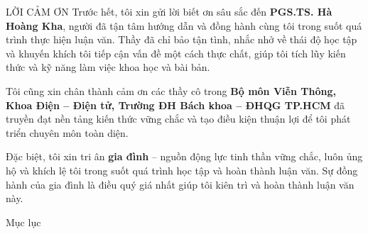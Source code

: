 \begin{frame}[plain]
\centering
\begin{block}{\LARGE LỜI CẢM ƠN}
\small
Trước hết, tôi xin gửi lời biết ơn sâu sắc đến 
\textbf{PGS.TS. Hà Hoàng Kha}, người đã tận tâm hướng dẫn và đồng hành cùng tôi trong suốt quá trình thực hiện luận văn. Thầy đã chỉ bảo tận tình, nhắc nhở về thái độ học tập và khuyến khích tôi tiếp cận vấn đề một cách thực chất, giúp tôi tích lũy kiến thức và kỹ năng làm việc khoa học và bài bản.

\vspace{0.8em}

Tôi cũng xin chân thành cảm ơn các thầy cô trong 
\textbf{Bộ môn Viễn Thông, Khoa Điện – Điện tử, Trường ĐH Bách khoa – ĐHQG TP.HCM} đã truyền đạt nền tảng kiến thức vững chắc và tạo điều kiện thuận lợi để tôi phát triển chuyên môn toàn diện.

\vspace{0.8em}

Đặc biệt, tôi xin tri ân \textbf{gia đình} – nguồn động lực tinh thần vững chắc, luôn ủng hộ và khích lệ tôi trong suốt quá trình học tập và hoàn thành luận văn. Sự đồng hành của gia đình là điều quý giá nhất giúp tôi kiên trì và hoàn thành luận văn này.
\end{block}
\end{frame}
\begin{frame}{Mục lục}
    \tableofcontents[hideallsubsections]
\end{frame}
